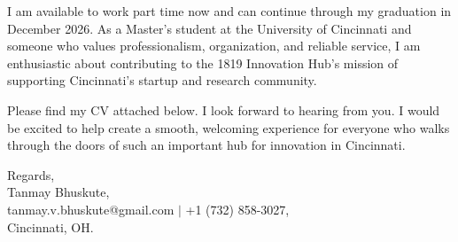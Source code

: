 \documentclass[11pt]{letter}
\begin{document}
\begin{letter}{}
I am available to work part time now and can continue through my graduation in December 2026. As a Master's student at the University of Cincinnati and someone who values professionalism, organization, and reliable service, I am enthusiastic about contributing to the 1819 Innovation Hub's mission of supporting Cincinnati's startup and research community.

Please find my CV attached below. I look forward to hearing from you. I would be excited to help create a smooth, welcoming experience for everyone who walks through the doors of such an important hub for innovation in Cincinnati.

{\setlength{\parskip}{0pt}
Regards,\\
Tanmay Bhuskute,\\
tanmay.v.bhuskute@gmail.com $\mid$ +1 (732) 858-3027,\\
Cincinnati, OH.
}

\end{letter}
\end{document}
